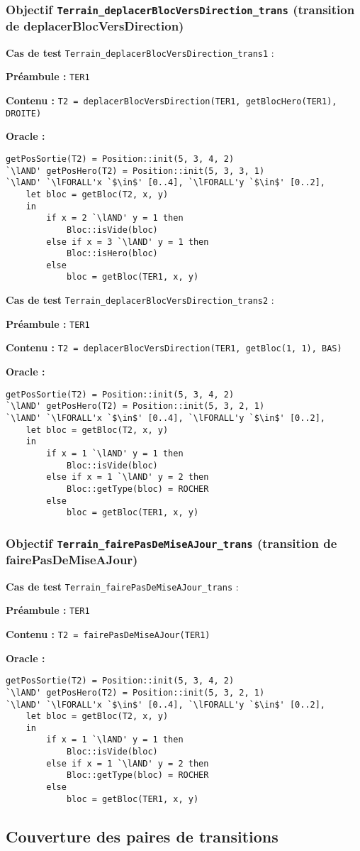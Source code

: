 \documentclass{article}
\newcommand{\cmd}[1]{\texttt{#1}}
\newcommand{\lAND}{$\land$}
\newcommand{\lFORALL}{$\forall$}
\newcommand{\obj}[2]{\subsubsection*{\large{\textbf{Objectif {\cmd{#1} (#2)}}}}}
\newenvironment{cas}[1]
{
	\hspace{1em}\textbf{Cas de test} \cmd{#1} :
	\begin{list}{}{}
}{
	\end{list}\vspace{1em}
}
\newcommand{\pre}[1]{\item \textbf{Préambule :} \cmd{#1}}
\newcommand{\ope}[1]{\item \textbf{Contenu :} \cmd{#1}}
\newcommand{\oram}{\item \textbf{Oracle :}}
\begin{document}
\obj{Terrain\_deplacerBlocVersDirection\_trans} {transition de deplacerBlocVersDirection}
	\begin{cas} {Terrain\_deplacerBlocVersDirection\_trans1}
		\pre{TER1}
		\ope{T2 = deplacerBlocVersDirection(TER1, getBlocHero(TER1), DROITE)}
		\oram{}
		\begin{lstlisting}
getPosSortie(T2) = Position::init(5, 3, 4, 2)
`\lAND' getPosHero(T2) = Position::init(5, 3, 3, 1)
`\lAND' `\lFORALL'x `$\in$' [0..4], `\lFORALL'y `$\in$' [0..2],
	let bloc = getBloc(T2, x, y)
	in
		if x = 2 `\lAND' y = 1 then
			Bloc::isVide(bloc)
		else if x = 3 `\lAND' y = 1 then
			Bloc::isHero(bloc)
		else
			bloc = getBloc(TER1, x, y)
		\end{lstlisting}
	\end{cas}

	\begin{cas} {Terrain\_deplacerBlocVersDirection\_trans2}
		\pre{TER1}
		\ope{T2 = deplacerBlocVersDirection(TER1, getBloc(1, 1), BAS)}
		\oram{}
		\begin{lstlisting}
getPosSortie(T2) = Position::init(5, 3, 4, 2)
`\lAND' getPosHero(T2) = Position::init(5, 3, 2, 1)
`\lAND' `\lFORALL'x `$\in$' [0..4], `\lFORALL'y `$\in$' [0..2],
	let bloc = getBloc(T2, x, y)
	in
		if x = 1 `\lAND' y = 1 then
			Bloc::isVide(bloc)
		else if x = 1 `\lAND' y = 2 then
			Bloc::getType(bloc) = ROCHER
		else
			bloc = getBloc(TER1, x, y)
		\end{lstlisting}
	\end{cas}

\obj{Terrain\_fairePasDeMiseAJour\_trans} {transition de fairePasDeMiseAJour}
	\begin{cas} {Terrain\_fairePasDeMiseAJour\_trans}
		\pre{TER1}
		\ope{T2 = fairePasDeMiseAJour(TER1)}
		\oram{}
		\begin{lstlisting}
getPosSortie(T2) = Position::init(5, 3, 4, 2)
`\lAND' getPosHero(T2) = Position::init(5, 3, 2, 1)
`\lAND' `\lFORALL'x `$\in$' [0..4], `\lFORALL'y `$\in$' [0..2],
	let bloc = getBloc(T2, x, y)
	in
		if x = 1 `\lAND' y = 1 then
			Bloc::isVide(bloc)
		else if x = 1 `\lAND' y = 2 then
			Bloc::getType(bloc) = ROCHER
		else
			bloc = getBloc(TER1, x, y)
		\end{lstlisting}
	\end{cas}


\subsection*{Couverture des paires de transitions}
\end{document}
